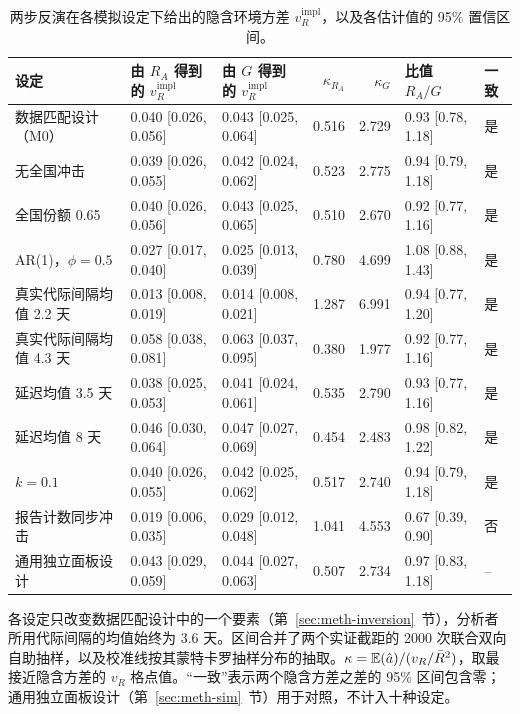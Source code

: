 \begin{table}[htbp]
\centering
\footnotesize
\setlength{\tabcolsep}{4pt}
\caption{两步反演在各模拟设定下给出的隐含环境方差 $v_R^{\mathrm{impl}}$，以及各估计值的 95\% 置信区间。}
\label{tab:s8}
\begin{tabular}{lllrrll}
\toprule
设定 & 由 $R_A$ 得到的 $v_R^{\mathrm{impl}}$ & 由 $G$ 得到的 $v_R^{\mathrm{impl}}$ & $\kappa_{R_A}$ & $\kappa_G$ & 比值 $R_A/G$ & 一致 \\
\midrule
数据匹配设计（M0） & 0.040 [0.026, 0.056] & 0.043 [0.025, 0.064] & 0.516 & 2.729 & 0.93 [0.78, 1.18] & 是 \\
无全国冲击 & 0.039 [0.026, 0.055] & 0.042 [0.024, 0.062] & 0.523 & 2.775 & 0.94 [0.79, 1.18] & 是 \\
全国份额 0.65 & 0.040 [0.026, 0.056] & 0.043 [0.025, 0.065] & 0.510 & 2.670 & 0.92 [0.77, 1.16] & 是 \\
AR(1)，$\phi=0.5$ & 0.027 [0.017, 0.040] & 0.025 [0.013, 0.039] & 0.780 & 4.699 & 1.08 [0.88, 1.43] & 是 \\
真实代际间隔均值 2.2 天 & 0.013 [0.008, 0.019] & 0.014 [0.008, 0.021] & 1.287 & 6.991 & 0.94 [0.77, 1.20] & 是 \\
真实代际间隔均值 4.3 天 & 0.058 [0.038, 0.081] & 0.063 [0.037, 0.095] & 0.380 & 1.977 & 0.92 [0.77, 1.16] & 是 \\
延迟均值 3.5 天 & 0.038 [0.025, 0.053] & 0.041 [0.024, 0.061] & 0.535 & 2.790 & 0.93 [0.77, 1.16] & 是 \\
延迟均值 8 天 & 0.046 [0.030, 0.064] & 0.047 [0.027, 0.069] & 0.454 & 2.483 & 0.98 [0.82, 1.22] & 是 \\
$k=0.1$ & 0.040 [0.026, 0.055] & 0.042 [0.025, 0.062] & 0.517 & 2.740 & 0.94 [0.79, 1.18] & 是 \\
报告计数同步冲击 & 0.019 [0.006, 0.035] & 0.029 [0.012, 0.048] & 1.041 & 4.553 & 0.67 [0.39, 0.90] & 否 \\
通用独立面板设计 & 0.043 [0.029, 0.059] & 0.044 [0.027, 0.063] & 0.507 & 2.734 & 0.97 [0.83, 1.18] & -- \\
\bottomrule
\end{tabular}
\par\smallskip
\begin{minipage}{0.95\linewidth}\scriptsize 各设定只改变数据匹配设计中的一个要素（第~\ref{sec:meth-inversion}~节），分析者所用代际间隔的均值始终为 3.6 天。区间合并了两个实证截距的 2000 次联合双向自助抽样，以及校准线按其蒙特卡罗抽样分布的抽取。$\kappa=\mathbb{E}(\hat{a})/(v_R/\bar{R}^2)$，取最接近隐含方差的 $v_R$ 格点值。“一致”表示两个隐含方差之差的 95\% 区间包含零；通用独立面板设计（第~\ref{sec:meth-sim}~节）用于对照，不计入十种设定。\end{minipage}
\end{table}
